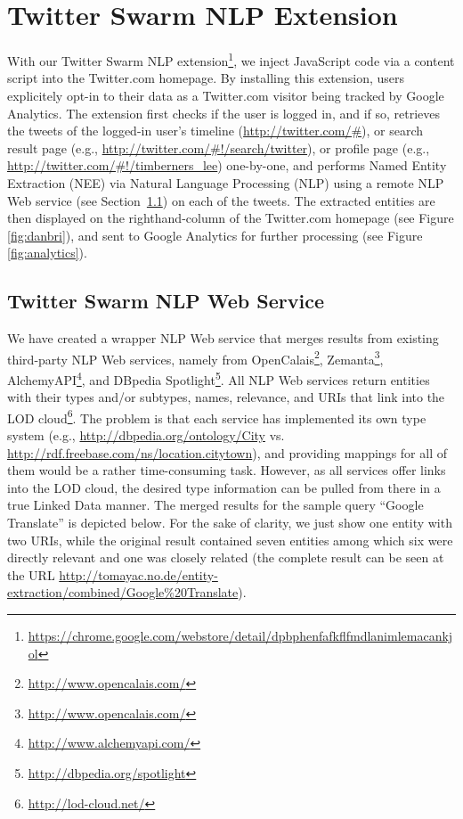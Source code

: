 \documentclass[runningheads,a4paper]{llncs}
\begin{document}
\section{Twitter Swarm NLP Extension}\label{sec:twitterswarm}
With our Twitter Swarm NLP extension\footnote{\url{https://chrome.google.com/webstore/detail/dpbphenfafkflfmdlanimlemacankjol}}, we inject JavaScript code via a content script into the Twitter.com homepage. By installing this extension, users explicitely opt-in to their data as a Twitter.com visitor being tracked by Google Analytics. The extension first checks if the user is logged in, and if so, retrieves the tweets of the logged-in user's timeline (\url{http://twitter.com/#}), or search result page (e.g., \url{http://twitter.com/#!/search/twitter}), or profile page (e.g., \url{http://twitter.com/#!/timberners_lee}) one-by-one, and performs Named Entity Extraction (NEE) via Natural Language Processing (NLP) using a remote NLP Web service (see Section~\ref{sec:webservice}) on each of the tweets. The extracted entities are then displayed on the righthand-column of the Twitter.com homepage (see Figure \ref{fig:danbri}), and sent to Google Analytics for further processing (see Figure \ref{fig:analytics}).

\subsection{Twitter Swarm NLP Web Service}\label{sec:webservice}
We have created a wrapper NLP Web service that merges results from existing third-party NLP Web services, namely from OpenCalais\footnote{\url{http://www.opencalais.com/}}, Zemanta\footnote{\url{http://www.opencalais.com/}}, AlchemyAPI\footnote{\url{http://www.alchemyapi.com/}}, and DBpedia Spotlight\footnote{\url{http://dbpedia.org/spotlight}}. All NLP Web services return entities with their types and/or subtypes, names, relevance, and URIs that link into the LOD cloud\footnote{\url{http://lod-cloud.net/}}. The problem is that each service has implemented its own type system (e.g., \url{http://dbpedia.org/ontology/City} vs. \url{http://rdf.freebase.com/ns/location.citytown}), and providing mappings for all of them would be a rather time-consuming task. However, as all services offer links into the LOD cloud, the desired type information can be pulled from there in a true Linked Data manner. The merged results for the sample query ``Google Translate'' is depicted below. For the sake of clarity, we just show one entity with two URIs, while the original result contained seven entities among which six were directly relevant and one was closely related (the complete result can be seen at the URL \url{http://tomayac.no.de/entity-extraction/combined/Google%20Translate}).
\end{document}
